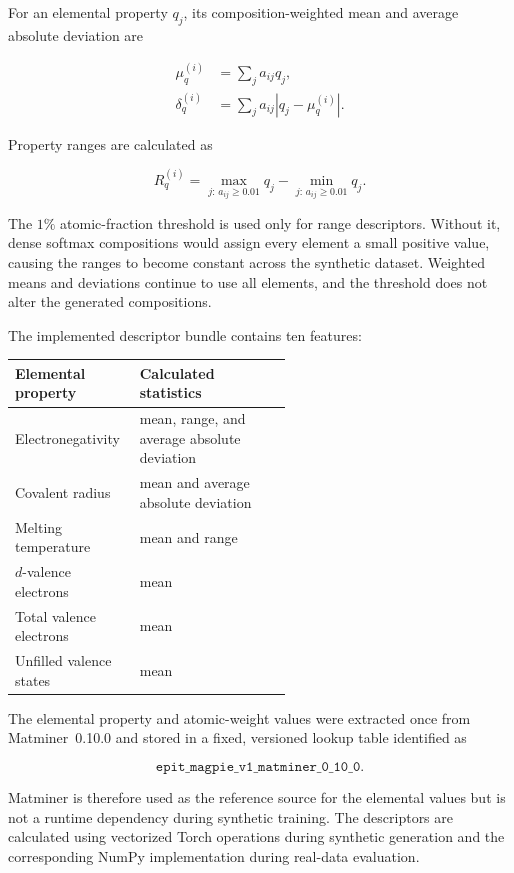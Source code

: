 \documentclass{article}
\begin{document}
For an elemental property \(q_j\), its composition-weighted mean and average
absolute deviation are

\begin{equation}
\begin{aligned}
\mu_q^{(i)}
&=
\sum_j a_{ij}q_j,\\
\delta_q^{(i)}
&=
\sum_j a_{ij}
\left|
q_j-\mu_q^{(i)}
\right|.
\end{aligned}
\label{eq:magpie-mean-deviation}
\end{equation}

Property ranges are calculated as

\begin{equation}
R_q^{(i)}
=
\max_{j:\,a_{ij}\geq0.01}q_j
-
\min_{j:\,a_{ij}\geq0.01}q_j.
\label{eq:magpie-range}
\end{equation}

The \(1\%\) atomic-fraction threshold is used only for range descriptors.
Without it, dense softmax compositions would assign every element a small
positive value, causing the ranges to become constant across the synthetic
dataset. Weighted means and deviations continue to use all elements, and the
threshold does not alter the generated compositions.

The implemented descriptor bundle contains ten features:

\begin{center}
\small
\begin{tabular}{lp{0.55\linewidth}}
\hline
\textbf{Elemental property} & \textbf{Calculated statistics} \\
\hline
Electronegativity
& mean, range, and average absolute deviation \\
Covalent radius
& mean and average absolute deviation \\
Melting temperature
& mean and range \\
\(d\)-valence electrons
& mean \\
Total valence electrons
& mean \\
Unfilled valence states
& mean \\
\hline
\end{tabular}
\end{center}

The elemental property and atomic-weight values were extracted once from
Matminer~0.10.0 and stored in a fixed, versioned lookup table identified as

\[
\texttt{epit\_magpie\_v1\_matminer\_0\_10\_0}.
\]

Matminer is therefore used as the reference source for the elemental values but
is not a runtime dependency during synthetic training. The descriptors are
calculated using vectorized Torch operations during synthetic generation and
the corresponding NumPy implementation during real-data evaluation.
\end{document}
